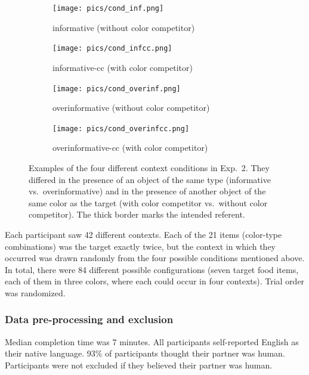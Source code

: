 \documentclass[11pt]{article}
\begin{document}
\begin{figure}[bt!]
	\begin{subfigure}{.5\textwidth}
		\centering
		\texttt{[image: pics/cond\_inf.png]}
		\caption{informative (without color competitor)}
		\label{fig:condInf}
	\end{subfigure}
	\begin{subfigure}{.5\textwidth}
		\centering
		\texttt{[image: pics/cond\_infcc.png]}
		\centering
		\caption{informative-cc (with color competitor)}
		\label{fig:condInfcc}
	\end{subfigure}
	\begin{subfigure}{.5\textwidth}
		\centering
		\texttt{[image: pics/cond\_overinf.png]}
		\caption{overinformative (without color competitor)}
		\label{fig:condOverinf}
	\end{subfigure}
	\begin{subfigure}{.5\textwidth}
		\centering
		\texttt{[image: pics/cond\_overinfcc.png]}
		\centering
		\caption{overinformative-cc (with color competitor)}
		\label{fig:condOverinfcc}
	\end{subfigure}
	\caption{Examples of the four different context conditions in Exp.~2. They differed in the presence of an object of the same type (informative vs.~overinformative) and in the presence of another object of the same color as the target (with color competitor vs.~without color competitor). The thick border marks the intended referent.}
	\label{fig:conditions}
\end{figure}

Each participant saw 42 different contexts. Each of the 21 items (color-type combinations) was the target exactly twice, but the context in which they occurred was drawn randomly from the four possible conditions mentioned above. In total, there were 84 different possible configurations (seven target food items, each of them in three colors, where each could occur in four contexts). Trial order was randomized.


\subsubsection{Data pre-processing and exclusion}

Median completion time was 7 minutes. All participants self-reported English as their native language. 93\% of participants thought their partner was human. Participants were not excluded if they believed their partner was human.
\end{document}

